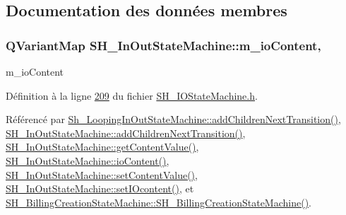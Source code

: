 \subsection{Documentation des données membres}
\hypertarget{classSH__InOutStateMachine_a661a1c7bd3b1086b3b5cd60ca957ecbd}{
\subsubsection[{m\-\_\-io\-Content}]{\setlength{\rightskip}{0pt plus 5cm}Q\-Variant\-Map S\-H\-\_\-\-In\-Out\-State\-Machine\-::m\-\_\-io\-Content\hspace{0.3cm}{\ttfamily [protected]}, {\ttfamily [inherited]}}}\label{classSH__InOutStateMachine_a661a1c7bd3b1086b3b5cd60ca957ecbd}


m\-\_\-io\-Content 



Définition à la ligne \hyperlink{SH__IOStateMachine_8h_source_l00209}{209} du fichier \hyperlink{SH__IOStateMachine_8h_source}{S\-H\-\_\-\-I\-O\-State\-Machine.\-h}.



Référencé par \hyperlink{classSh__LoopingInOutStateMachine_acfd8d0711c793b13c759f6c50be6a315}{Sh\-\_\-\-Looping\-In\-Out\-State\-Machine\-::add\-Children\-Next\-Transition()}, \hyperlink{classSH__InOutStateMachine_a689e5513ef6ef3fc1598efacd413372e}{S\-H\-\_\-\-In\-Out\-State\-Machine\-::add\-Children\-Next\-Transition()}, \hyperlink{classSH__InOutStateMachine_a2cdd914f1e597ac52d021106eec75c89}{S\-H\-\_\-\-In\-Out\-State\-Machine\-::get\-Content\-Value()}, \hyperlink{classSH__InOutStateMachine_a79b456cb2e353cb61ef9fe19c97fc8fb}{S\-H\-\_\-\-In\-Out\-State\-Machine\-::io\-Content()}, \hyperlink{classSH__InOutStateMachine_aa2766b7a7ba39c35a10df7fc0c151b4f}{S\-H\-\_\-\-In\-Out\-State\-Machine\-::set\-Content\-Value()}, \hyperlink{classSH__InOutStateMachine_a23a925522339132a51d16a7cff9074b9}{S\-H\-\_\-\-In\-Out\-State\-Machine\-::set\-I\-Ocontent()}, et \hyperlink{classSH__BillingCreationStateMachine_ad62b77fa4aeafe200056ff3974562f83}{S\-H\-\_\-\-Billing\-Creation\-State\-Machine\-::\-S\-H\-\_\-\-Billing\-Creation\-State\-Machine()}.

